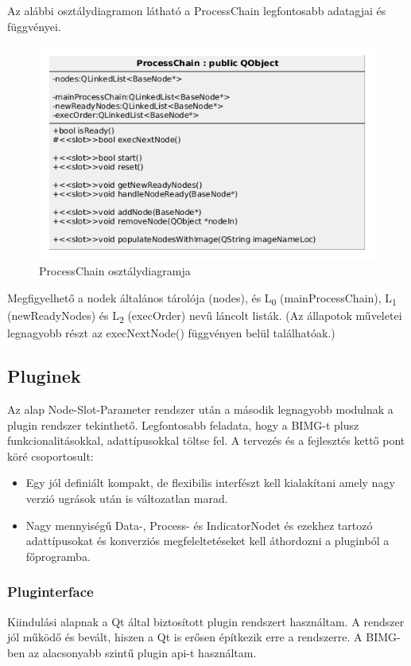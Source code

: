 \documentclass[a4paper,12pt,oneside]{report}
\begin{document}
Az alábbi osztálydiagramon látható a ProcessChain legfontosabb adatagjai és függvényei.
\begin{center}
\begin{figure}[h]
  \includegraphics[width=1.0\textwidth]{process_chain_diag.png}
  \caption{ProcessChain osztálydiagramja }

  \label{fig:bimg_processchain_diag}
\end{figure}
\end{center}
Megfigyelhető a nodek általános tárolója (nodes), és L\textsubscript{0} (mainProcessChain), L\textsubscript{1} (newReadyNodes) és L\textsubscript{2} (execOrder) nevű láncolt listák. (Az állapotok műveletei legnagyobb részt az execNextNode() függvényen belül találhatóak.)

\subsection{Pluginek}
Az alap Node-Slot-Parameter rendszer után a második legnagyobb modulnak a plugin rendszer tekinthető. Legfontosabb feladata, hogy a BIMG-t plusz funkcionalitásokkal, adattípusokkal töltse fel. A tervezés és a fejlesztés kettő pont köré csoportosult:
			\begin{itemize}
			\itemsep0em
			\item Egy jól definiált kompakt, de flexibilis interfészt kell kialakítani amely nagy verzió ugrások után is változatlan marad.
			\item Nagy mennyiségű Data-, Process- és IndicatorNodet és ezekhez tartozó adattípusokat és konverziós megfeleltetéseket kell áthordozni a pluginból a főprogramba.
		\end{itemize}

\subsubsection{Pluginterface}
Kiindulási alapnak a Qt által biztosított plugin rendszert használtam. A rendszer jól működő és bevált, hiszen a Qt is erősen építkezik erre a rendszerre\cite{website:qt_plugin}.  A BIMG-ben az alacsonyabb szintű plugin api-t használtam.
\end{document}
